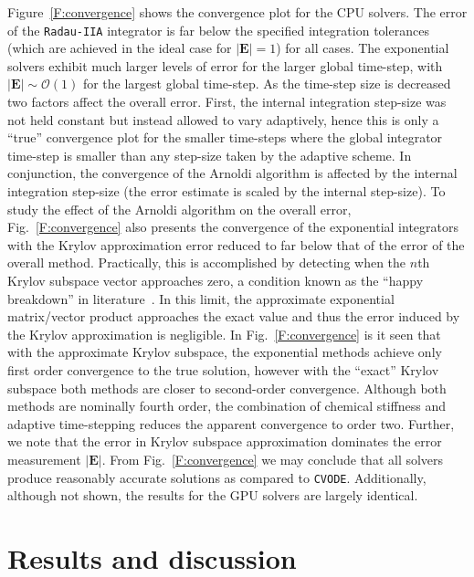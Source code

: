 \documentclass[final,twocolumn]{elsarticle}
\begin{document}
Figure~\ref{F:convergence} shows the convergence plot for the CPU solvers.
The error of the \texttt{Radau-IIA} integrator is far below the specified integration tolerances (which are achieved in the ideal case for $\left\lvert\textbf{E}\right\rvert = 1$) for all cases.
The exponential solvers exhibit much larger levels of error for the larger global time-step, with $\left\lvert\textbf{E}\right\rvert \sim \mathcal{O}(1)$ for the largest global time-step.
As the time-step size is decreased two factors affect the overall error.
First, the internal integration step-size was not held constant but instead allowed to vary adaptively, hence this is only a ``true'' convergence plot for the smaller time-steps where the global integrator time-step is smaller than any step-size taken by the adaptive scheme.
In conjunction, the convergence of the Arnoldi algorithm is affected by the internal integration step-size (the error estimate is scaled by the internal step-size).
To study the effect of the Arnoldi algorithm on the overall error, Fig.~\ref{F:convergence} also presents the convergence of the exponential integrators with the Krylov approximation error reduced to far below that of the error of the overall method.
Practically, this is accomplished by detecting when the $n$th Krylov subspace vector approaches zero, a condition known as the ``happy breakdown'' in literature~\cite{datta2010numerical}.
In this limit, the approximate exponential matrix\slash vector product approaches the exact value and thus the error induced by the Krylov approximation is negligible.
In Fig.~\ref{F:convergence} is it seen that with the approximate Krylov subspace, the exponential methods achieve only first order convergence to the true solution, however with the ``exact'' Krylov subspace both methods are closer to second-order convergence.
Although both methods are nominally fourth order, the combination of chemical stiffness and adaptive time-stepping reduces the apparent convergence to order two.
Further, we note that the error in Krylov subspace approximation dominates the error measurement $\lvert\textbf{E}\rvert$.
From Fig.~\ref{F:convergence} we may conclude that all solvers produce reasonably accurate solutions as compared to \texttt{CVODE}.
Additionally, although not shown, the results for the GPU solvers are largely identical.


\section{Results and discussion}
\label{S:results}
\ifmeasure
\addvspace{10pt}
\fi
\end{document}

